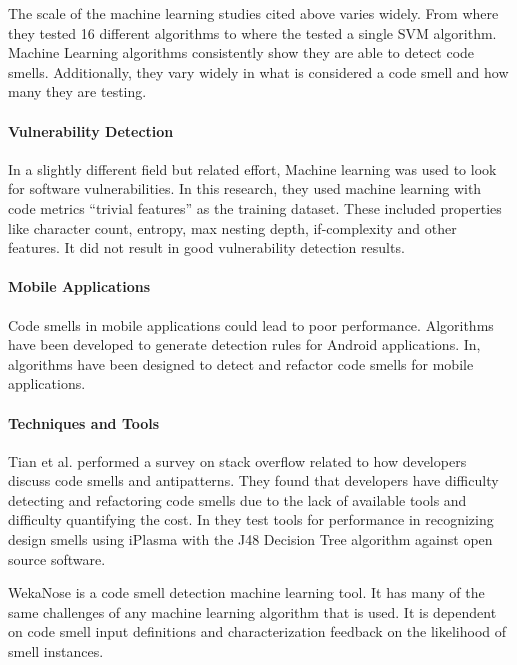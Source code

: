 \documentclass[conference]{IEEEtran}
\begin{document}
The scale of the machine learning studies cited above varies widely. From \cite{arcelli_fontana_comparing_2016} where they tested 16 different algorithms to \cite{kaur_support_2017} where the tested a single SVM algorithm. 
Machine Learning algorithms consistently show they are able to detect code smells. 
Additionally, they vary widely in what is considered a code smell and how many they are testing.

\paragraph{Vulnerability Detection}
In a slightly different field but related effort, Machine learning was used to look for software vulnerabilities\cite{chernis_machine_2018}. In this research, they used machine learning with code metrics ``trivial features'' as the training dataset. These included properties like character count, entropy, max nesting depth, if-complexity and other features. It did not result in good vulnerability detection results.

\paragraph{Mobile Applications}
Code smells in mobile applications could lead to poor performance. Algorithms have been developed\cite{rubin_sniffing_2019}\cite{ibrahim_reducing_2018} to generate detection rules for Android applications. In\cite{ibrahim_reducing_2018}, algorithms have been designed to detect and refactor code smells for mobile applications.

\paragraph{Techniques and Tools}
Tian et al.\cite{tian_how_2019} performed a survey on stack overflow related to how developers discuss code smells and antipatterns. 
They found that developers have difficulty detecting and refactoring code smells due to the lack of available tools and difficulty quantifying the cost.
In\cite{singh_systematic_2018} they test tools for performance in recognizing design smells using iPlasma with the J48 Decision Tree algorithm against open source software.

WekaNose is a code smell detection machine learning tool\cite{azadi_poster:_2018}. It has many of the same challenges of any machine learning algorithm that is used. It is dependent on code smell input definitions and characterization feedback on the likelihood of smell instances. 
\end{document}
